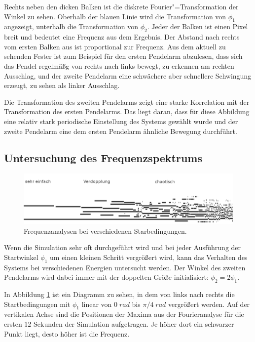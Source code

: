 Rechts neben den dicken Balken ist die diskrete Fourier"=Transformation der Winkel zu sehen.
Oberhalb der blauen Linie wird die Transformation von $\phi_1$ angezeigt, unterhalb die Transformation von $\phi_2$.
Jeder der Balken ist einen Pixel breit und bedeutet eine Frequenz aus dem Ergebnis.
Der Abstand nach rechts vom ersten Balken aus ist proportional zur Frequenz.
Aus dem aktuell zu sehenden Fester ist zum Beispiel für den ersten Pendelarm abzulesen, dass sich das Pendel regelmäßg von rechts nach links bewegt, zu erkennen am rechten Ausschlag, und der zweite Pendelarm eine schwächere aber schnellere Schwingung erzeugt, zu sehen als linker Ausschlag.

Die Transformation des zweiten Pendelarms zeigt eine starke Korrelation mit der Transformation des ersten Pendelarms. Das liegt daran, dass für diese Abbildung eine relativ stark periodische Einstellung des Systems gewählt wurde und der zweite Pendelarm eine dem ersten Pendelarm ähnliche Bewegung durchführt.

\subsection{Untersuchung des Frequenzspektrums}

\begin{figure}[bht]
  \includegraphics[width=\textwidth]{images/frequencies_text.png}
  \caption{Frequenzanalysen bei verschiedenen Starbedingungen.}
  \label{fig:frequencies}
\end{figure}

Wenn die Simulation sehr oft durchgeführt wird und bei jeder Ausführung der Startwinkel $\phi_1$ um einen kleinen Schritt vergrößert wird, kann das Verhalten des Systems bei verschiedenen Energien untersucht werden.
Der Winkel des zweiten Pendelarms wird dabei immer mit der doppelten Größe initialisiert: $\phi_2 = 2\phi_1$.

In Abbildung \ref{fig:frequencies} ist ein Diagramm zu sehen, in dem von links nach rechts die Startbedingungen mit $\phi_1$ linear von $0\;rad$ bis $\pi/4\;rad$ vergrößert werden.
Auf der vertikalen Achse sind die Positionen der Maxima aus der Fourieranalyse für die ersten 12 Sekunden der Simulation aufgetragen. Je höher dort ein schwarzer Punkt liegt, desto höher ist die Frequenz.

